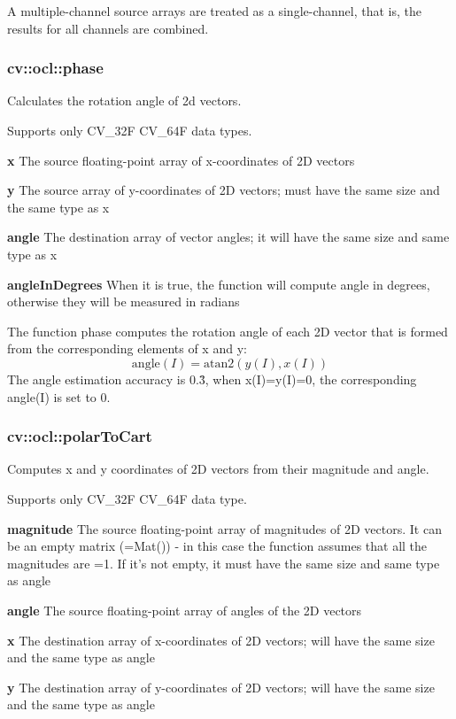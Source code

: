 \documentclass{article}
\begin{document}
A multiple-channel source arrays are treated as a single-channel, that is,
the results for all channels are combined.

\newpage

\subsubsection{cv::ocl::phase }
\label{subsubsec:mylabel25}
Calculates the rotation angle of 2d vectors.

Supports only CV{\_}32F CV{\_}64F data types.

\textbf{x }The source floating-point array of x-coordinates of 2D vectors

\textbf{y }The source array of y-coordinates of 2D vectors; must have the
same size and the same type as x

\textbf{angle }The destination array of vector angles; it will have the same
size and same type as x

\textbf{angleInDegrees }When it is true, the function will compute angle in
degrees, otherwise they will be measured in radians

The function phase computes the rotation angle of each 2D vector that is
formed from the corresponding elements of x and y:
\[
\mbox{angle}\left( I \right)=\mbox{atan}2\left( {y\left( I \right),x\left( I
\right)} \right)
\]
The angle estimation accuracy is 0.3\r{ }, when x(I)=y(I)=0, the
corresponding angle(I) is set to 0.

\newpage

\subsubsection{cv::ocl::polarToCart }
\label{subsubsec:mylabel26}
Computes x and y coordinates of 2D vectors from their magnitude and angle.

Supports only CV{\_}32F CV{\_}64F data type.

\textbf{magnitude }The source floating-point array of magnitudes of 2D
vectors. It can be an empty matrix (=Mat()) - in this case the function
assumes that all the magnitudes are =1. If it's not empty, it must have the
same size and same type as angle

\textbf{angle }The source floating-point array of angles of the 2D vectors

\textbf{x }The destination array of x-coordinates of 2D vectors; will have
the same size and the same type as angle

\textbf{y }The destination array of y-coordinates of 2D vectors; will have
the same size and the same type as angle
\end{document}
